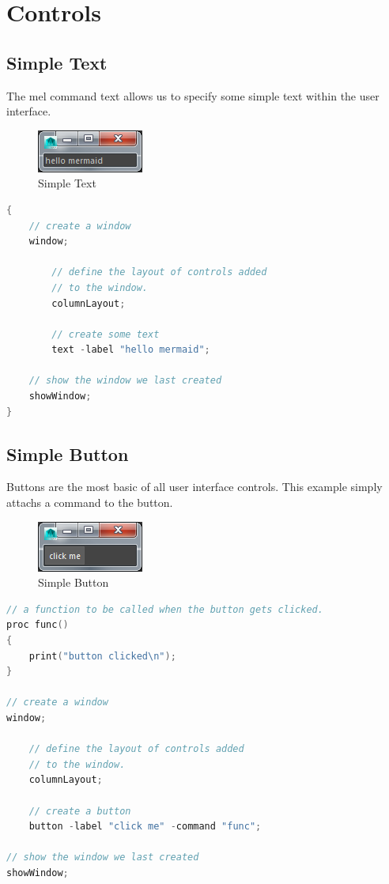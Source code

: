 \section{Controls}
\subsection{Simple Text}
The mel command text allows us to specify some simple text within the user interface.

\begin{figure}[tbh]
	\centering
	\includegraphics[width=0.2\linewidth]{figures/GUI/simple_text}
	\caption{Simple Text}
	\label{fig:simpletext}
\end{figure}


\begin{lstlisting}[language = C++]
{
	// create a window
	window;
	
		// define the layout of controls added 
		// to the window.
		columnLayout;
		
		// create some text
		text -label "hello mermaid";
	
	// show the window we last created
	showWindow;
}
\end{lstlisting}

\subsection{Simple Button}
Buttons are the most basic of all user interface controls. This example simply attachs a command to the button.

\begin{figure}[tbh]
	\centering
	\includegraphics[width=0.2\linewidth]{figures/GUI/simple_button}
	\caption{Simple Button}
	\label{fig:simplebutton}
\end{figure}

\begin{lstlisting}[language = C++]
// a function to be called when the button gets clicked.
proc func()
{
	print("button clicked\n");
}

// create a window
window;

	// define the layout of controls added 
	// to the window.
	columnLayout;
	
	// create a button
	button -label "click me" -command "func";

// show the window we last created
showWindow;
\end{lstlisting}

